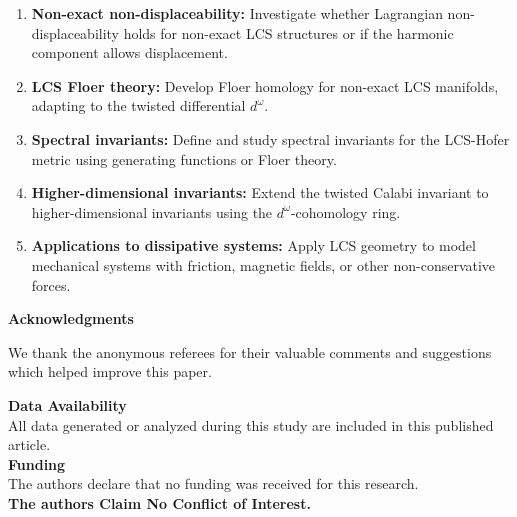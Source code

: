 \documentclass[11pt,a4paper]{amsart}
\theoremstyle{definition}
\theoremstyle{remark}
\begin{document}
	\begin{enumerate}
		\item \textbf{Non-exact non-displaceability:} Investigate whether Lagrangian non-displaceability holds for non-exact LCS structures or if the harmonic component allows displacement.
		
		\item \textbf{LCS Floer theory:} Develop Floer homology for non-exact LCS manifolds, adapting to the twisted differential $d^\omega$.
		
		\item \textbf{Spectral invariants:} Define and study spectral invariants for the LCS-Hofer metric using generating functions or Floer theory.
		
		\item \textbf{Higher-dimensional invariants:} Extend the twisted Calabi invariant to higher-dimensional invariants using the $d^\omega$-cohomology ring.
		
		\item \textbf{Applications to dissipative systems:} Apply LCS geometry to model mechanical systems with friction, magnetic fields, or other non-conservative forces.
	\end{enumerate}
	
	\begin{center}
		\textbf{Acknowledgments}
	\end{center}
	
	We thank the anonymous referees for their valuable comments and suggestions which helped improve this paper.
	
	\textbf{Data Availability}\\
	All data generated or analyzed during this study are included in this published article.\\
	
	\textbf{Funding}\\
	The authors declare that no funding was received for this research.\\
	
	\textbf{The authors Claim No Conflict of Interest.}
	
\end{document}
